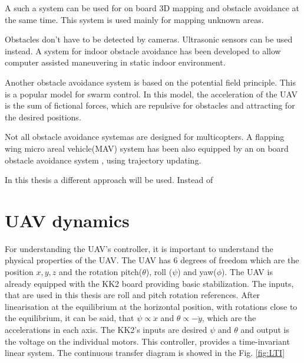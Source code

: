 \documentclass[a4paper,11pt,titlepage]{article}
\begin{document}
A such a system can be used for on board 3D mapping and obstacle avoidance\cite{weiss2011intuitive} at the same time. This system is used mainly for mapping unknown areas.

Obstacles don't have to be detected by cameras. Ultrasonic sensors can be used instead. A system for indoor obstacle avoidance\cite{gupta2015obstacle} has been developed to allow computer assisted maneuvering in static indoor environment. 

Another obstacle avoidance system is based on the potential field principle. This is a popular model for swarm control\cite{budiyanto2015uav}. In this model, the acceleration of the UAV is the sum of fictional forces, which are repulsive for obstacles and attracting for the desired positions.

Not all obstacle avoidance systemas are designed for multicopters. A flapping wing micro areal vehicle(MAV) system has been also equipped by an on board obstacle avoidance system \cite{tijmons2016obstacle}, using trajectory updating.

In this thesis a different approach will be used. Instead of 

\section{UAV dynamics}
For understanding the UAV's controller, it is important to understand the physical properties of the UAV. The UAV has 6 degrees of freedom which are the position $x, y, z$ and the rotation pitch($\theta$), roll ($\psi$) and yaw($\phi$). The UAV is already equipped with the KK2 board providing basic stabilization. The inputs, that are used in this thesis are roll and pitch rotation references. After linearisation at the equilibrium at the horizontal position, with rotations close to the equilibrium, it can be said, that $\psi \propto \ddot{x}$ and $\theta \propto -\ddot{y}$, which are the accelerations in each axis. The KK2's inputs are desired $\psi$ and $\theta$ and output is the voltage on the individual motors. This controller, provides a time-invariant linear system. The continuous transfer diagram is showed in the Fig. \ref{fig:LTI}
\end{document}
